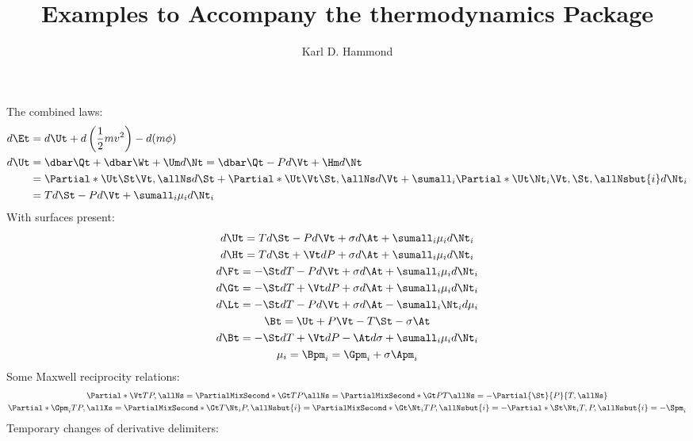 \documentclass{article}
\title{Examples to Accompany the \textsf{thermodynamics} Package}
\author{Karl D. Hammond}
\date{}
\begin{document}
\maketitle\noindent
The combined laws:
\begin{align*}
  d\Et &= d\Ut + d\left(\frac12 m v^2\right) - d(m\phi) \\
  d\Ut &= \dbar\Qt + \dbar\Wt + \Um d\Nt
        = \dbar\Qt - P d\Vt + \Hm d\Nt
    \\ &= \Partial*{\Ut}{\St}{\Vt,\allNs} d\St
        + \Partial*{\Ut}{\Vt}{\St,\allNs} d\Vt
        + \sumall_i \Partial*{\Ut}{\Nt_i}{\Vt,\St,\allNsbut{i}} d\Nt_i
    \\ &= T d\St - P d\Vt + \sumall_i \mu_i d\Nt_i
\end{align*}
With surfaces present:
\begin{gather*}
   d\Ut = T d\St - P d\Vt  + \sigma d\At + \sumall_i \mu_i d\Nt_i \\
   d\Ht = T d\St + \Vt dP  + \sigma d\At + \sumall_i \mu_i d\Nt_i \\
   d\Ft = -\St dT - P d\Vt + \sigma d\At + \sumall_i \mu_i d\Nt_i \\
   d\Gt = -\St dT + \Vt dP + \sigma d\At + \sumall_i \mu_i d\Nt_i \\
   d\Lt = -\St dT - P d\Vt + \sigma d\At - \sumall_i \Nt_i d\mu_i \\
    \Bt = \Ut + P\Vt - T\St - \sigma\At \\
   d\Bt = -\St dT + \Vt dP - \At d\sigma + \sumall_i \mu_i d\Nt_i \\
   \mu_i = \Bpm_i = \Gpm_i + \sigma \Apm_i
\end{gather*}
Some Maxwell reciprocity relations:
\begin{gather*}
  \Partial*{\Vt}{T}{P,\allNs}
    = \PartialMixSecond*{\Gt}{T}{P}{\allNs}
    = \PartialMixSecond*{\Gt}{P}{T}{\allNs}
    = -\Partial{\St}{P}{T,\allNs}
\\
    \Partial*{\Gpm_i}{T}{P,\allXs}
    = \PartialMixSecond*{\Gt}{T}{\Nt_i}{P,\allNsbut{i}}
    = \PartialMixSecond*{\Gt}{\Nt_i}{T}{P,\allNsbut{i}}
    = -\Partial*{\St}{\Nt_i}{T,P,\allNsbut{i}}
    = -\Spm_i
\end{gather*}
Temporary changes of derivative delimiters:
\end{document}

